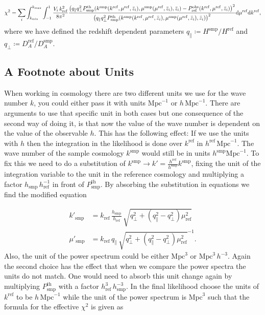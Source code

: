 \documentclass[../main.tex]{subfiles}
\begin{document}
\begin{equation*}
    \chi^2 = \sum_i \int_{k_\mathrm{min}}^{k_\mathrm{max}} \int_{-1}^{1} \frac{V_i\, k_\mathrm{ref}^2 }{8 \pi^2} 
    \frac{\left( q_\| q_\perp^2 P^\mathrm{th}_\mathrm{smp}(k^\mathrm{smp}(k^\mathrm{ref},\mu^\mathrm{ref},\bar{z}_i),\mu^\mathrm{smp}(\mu^\mathrm{ref},\bar{z}_i),\bar{z}_i)
    -P_\mathrm{ref}^\mathrm{obs}(k^\mathrm{ref},\mu^\mathrm{ref},\bar{z}_i)\right)^2}
    {\left( q_\| q_\perp^2 P^\mathrm{th}_\mathrm{smp}(k^\mathrm{smp}(k^\mathrm{ref},\mu^\mathrm{ref},\bar{z}_i),\mu^\mathrm{smp}(\mu^\mathrm{ref},\bar{z}_i),\bar{z}_i)\right)^2} \mathrm{d} \mu^\mathrm{ref} \mathrm{d} k^\mathrm{ref},
\end{equation*}
where we have defined the redshift dependent parameters $q_\| \coloneq H^\mathrm{smp}/H^\mathrm{ref}$ and $q_\perp \coloneq D_A^\mathrm{ref}/D_A^\mathrm{smp}$.\\

\subsection*{A Footnote about Units} 
When working in cosmology there are two different units we use for the wave number $k$, you could either pass it with units $\mathrm{Mpc}^{-1}$ or $h\,\mathrm{Mpc}^{-1}$. There are arguments to use that specific unit in both cases but one consequence of the second way of doing it, is that now the value of the wave number is dependent on the value of the observable $h$. This has the following effect: If we use the units with $h$ then the integration in the likelihood is done over $k^\mathrm{ref}$ in $h^\mathrm{ref} \,\mathrm{Mpc}^{-1}$. The wave number of the sample cosmology $k^\mathrm{smp}$ would still be in units $h^\mathrm{smp} \mathrm{Mpc}^{-1}$. To fix this we need to do a substitution of $k^\mathrm{smp}\to k' = \frac{h^\mathrm{ref}}{h^\mathrm{smp}} k^\mathrm{smp}$,  fixing the unit of the integration variable to the unit in the reference cosmology and multiplying a factor $h_\mathrm{smp}\,h_\mathrm{ref}^{-1}$ in front of $P^\mathrm{th}_\mathrm{smp}$. By absorbing  the substitution in equations  we find the modified equation 

 \begin{align*}
    k'_\mathrm{smp} &= k_\mathrm{ref}\,\frac{h_\mathrm{smp}}{h_\mathrm{ref}}\,\sqrt{q^2_\perp + \left(q_\|^2-q_\perp^2\right)\mu_\mathrm{ref}^2} \\
    \mu'_\mathrm{smp} &= k_\mathrm{ref}\, q_\|\,\sqrt{q^2_\perp + \left(q_\|^2-q_\perp^2\right)\mu_\mathrm{ref}^2}^{-1}.
 \end{align*}
Also, the unit of the power spectrum could be either $\mathrm{Mpc}^3$ or $\mathrm{Mpc}^3\, h^{-3}$. Again the second choice has the effect that when we compare the power spectra the units
do not match. One would need to absorb this unit change again by multiplying $P^\mathrm{th}_\mathrm{smp}$ with a factor $h_\mathrm{ref}^3\,h_\mathrm{smp}^{-3}$. In the final
likelihood choose the units of $k^\mathrm{ref}$ to be $h\, \mathrm{Mpc}^{-1}$ while the unit of the power spectrum is $\mathrm{Mpc}^3$ such that the formula for the effective $\chi^2$ is given as 
\end{document}
